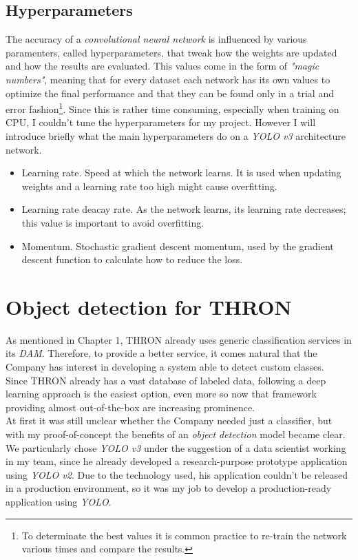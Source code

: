 	\subsection{Hyperparameters}
	The accuracy of a \emph{convolutional neural network} is influenced by various paramenters, called hyperparameters, that tweak how the weights are updated and how the results are evaluated. This values come in the form of \emph{"magic numbers"}, meaning that for every dataset each network has its own values to optimize the final performance and that they can be found only in a trial and error fashion\footnote{To determinate the best values it is common practice to re-train the network various times and compare the results.}. Since this is rather time consuming, especially when training on CPU, I couldn't tune the hyperparameters for my project. However I will introduce briefly what the main hyperparameters do on a \emph{YOLO v3} architecture network.
	\begin{itemize}
	\item Learning rate. Speed at which the network learns. It is used when updating weights and a learning rate too high might cause overfitting.
	\item Learning rate deacay rate. As the network learns, its learning rate decreases; this value is important to avoid overfitting.
	\item Momentum. Stochastic gradient descent momentum, used by the gradient descent function to calculate how to reduce the loss.
	\end{itemize}

\section{Object detection for THRON}
	As mentioned in Chapter 1, THRON already uses generic classification services in its \emph{DAM}. Therefore, to provide a better service, it comes natural that the Company has interest in developing a system able to detect custom classes. \\
	Since THRON already has a vast database of labeled data, following a deep learning approach is the easiest option, even more so now that framework providing almost out-of-the-box are increasing prominence. \\
	At first it was still unclear whether the Company needed just a classifier, but with my proof-of-concept the benefits of an \emph{object detection} model became clear. We particularly chose \emph{YOLO v3} under the suggestion of a data scientist working in my team, since he already developed a research-purpose prototype application using \emph{YOLO v2}. Due to the technology used, his application couldn't be released in a production environment, so it was my job to develop a production-ready application using \emph{YOLO}.